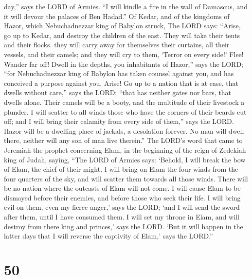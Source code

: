 day,'' says the LORD of Armies.  ``I will kindle a fire in
the wall of Damascus, and it will devour the palaces of Ben Hadad.''
 Of Kedar, and of the kingdoms of Hazor, which
Nebuchadnezzar king of Babylon struck, The LORD says: ``Arise, go up to
Kedar, and destroy the children of the east.  They will
take their tents and their flocks. they will carry away for themselves
their curtains, all their vessels, and their camels; and they will cry
to them, `Terror on every side!'  Flee! Wander far off!
Dwell in the depths, you inhabitants of Hazor,'' says the LORD; ``for
Nebuchadnezzar king of Babylon has taken counsel against you, and has
conceived a purpose against you.  Arise! Go up to a nation
that is at ease, that dwells without care,'' says the LORD; ``that has
neither gates nor bars, that dwells alone.  Their camels
will be a booty, and the multitude of their livestock a plunder. I will
scatter to all winds those who have the corners of their beards cut off;
and I will bring their calamity from every side of them,'' says the
LORD.  Hazor will be a dwelling place of jackals, a
desolation forever. No man will dwell there, neither will any son of man
live therein.''  The LORD's word that came to Jeremiah the
prophet concerning Elam, in the beginning of the reign of Zedekiah king
of Judah, saying,  ``The LORD of Armies says: `Behold, I
will break the bow of Elam, the chief of their might.  I
will bring on Elam the four winds from the four quarters of the sky, and
will scatter them towards all those winds. There will be no nation where
the outcasts of Elam will not come.  I will cause Elam to
be dismayed before their enemies, and before those who seek their life.
I will bring evil on them, even my fierce anger,' says the LORD; `and I
will send the sword after them, until I have consumed them.
 I will set my throne in Elam, and will destroy from there
king and princes,' says the LORD.  `But it will happen in
the latter days that I will reverse the captivity of Elam,' says the
LORD.''

\hypertarget{section-49}{%
\section{50}\label{section-49}}

